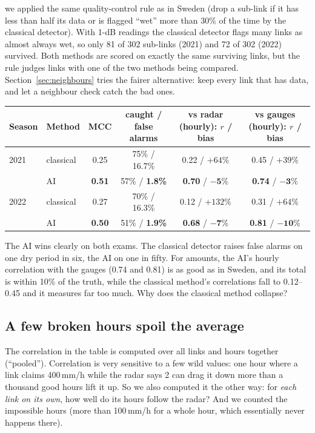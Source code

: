 \begin{careful}
we applied the same quality-control rule as in Sweden (drop a sub-link if it has less than half its data or is flagged
``wet'' more than 30\% of the time by the classical detector). With 1-dB readings the classical detector flags many
links as almost always wet, so only 81 of 302 sub-links (2021) and 72 of 302 (2022) survived. Both methods are scored
on exactly the same surviving links, but the rule judges links with one of the two methods being compared.
Section~\ref{sec:neighbours} tries the fairer alternative: keep every link that has data, and let a neighbour check
catch the bad ones.
\end{careful}

\begin{center}\footnotesize
\begin{tabular}{llcccc}
\toprule
Season & Method & MCC & caught / false alarms & vs radar (hourly): $r$ / bias & vs gauges (hourly): $r$ / bias\\
\midrule
2021 & classical & 0.25 & 75\% / 16.7\% & 0.22 / $+64\%$ & 0.45 / $+39\%$\\
     & AI        & \textbf{0.51} & 57\% / \textbf{1.8\%} & \textbf{0.70} / $\mathbf{-5\%}$ & \textbf{0.74} / $\mathbf{-3\%}$\\
2022 & classical & 0.27 & 70\% / 16.3\% & 0.12 / $+132\%$ & 0.31 / $+64\%$\\
     & AI        & \textbf{0.50} & 51\% / \textbf{1.9\%} & \textbf{0.68} / $\mathbf{-7\%}$ & \textbf{0.81} / $\mathbf{-10\%}$\\
\bottomrule
\end{tabular}
\end{center}

The AI wins clearly on both exams. The classical detector raises false alarms on one dry period in six, the AI on one in
fifty. For amounts, the AI's hourly correlation with the gauges (0.74 and 0.81) is as good as in Sweden, and its total is
within 10\% of the truth, while the classical method's correlations fall to 0.12--0.45 and it measures far too much.
Why does the classical method collapse?

\subsection{A few broken hours spoil the average}
The correlation in the table is computed over all links and hours together (``pooled''). Correlation is very sensitive to
a few wild values: one hour where a link claims 400\,mm/h while the radar says 2 can drag it down more than a thousand good
hours lift it up. So we also computed it the other way: for \emph{each link on its own}, how well do its hours follow the
radar? And we counted the impossible hours (more than 100\,mm/h for a whole hour, which essentially never happens there).

